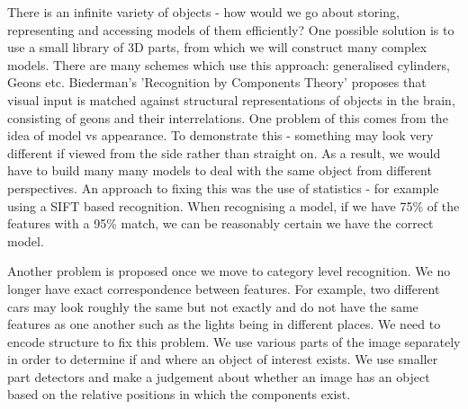 \documentclass{article}
\begin{document}
	\par 
	There is an infinite variety of objects - how would we go about storing, representing and accessing models of them efficiently? One possible solution is to use a small library of 3D parts, from which we will construct many complex models. There are many schemes which use this approach: generalised cylinders, Geons etc. Biederman's 'Recognition by Components Theory' proposes that visual input is matched against structural representations of objects in the brain, consisting of geons and their interrelations. One problem of this comes from the idea of model vs appearance. To demonstrate this - something may look very different if viewed from the side rather than straight on. As a result, we would have to build many many models to deal with the same object from different perspectives. An approach to fixing this was the use of statistics - for example using a SIFT based recognition. When recognising a model, if we have 75\% of the features with a 95\% match, we can be reasonably certain we have the correct model.
	
	\par 
	Another problem is proposed once we move to category level recognition. We no longer have exact correspondence between features. For example, two different cars may look roughly the same but not exactly and do not have the same features as one another such as the lights being in different places. We need to encode structure to fix this problem. We use various parts of the image separately in order to determine if and where an object of interest exists. We use smaller part detectors and make a judgement about whether an image has an object based on the relative positions in which the components exist.
	\newpage
	\listoffigures
	\printindex
\end{document}
